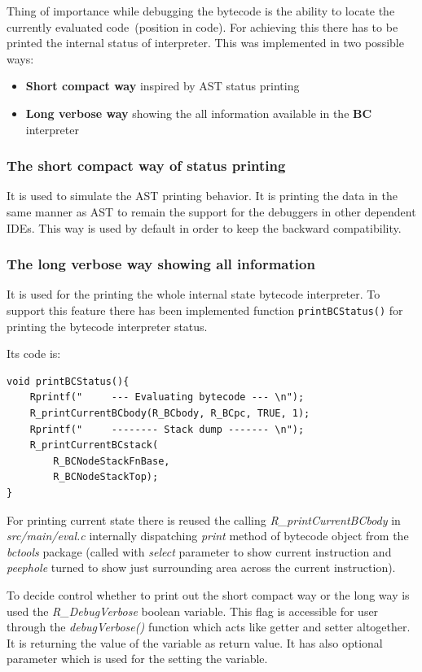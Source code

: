 \documentclass[thesis=M,english]{FITthesis}[2018/10/20]
\newcommand{\code}[1]{\texttt{#1}}
\begin{document}
Thing of importance while debugging the bytecode is the ability to locate the currently evaluated code~(position in code). For achieving this there has to be printed the internal status of interpreter. This was implemented in two possible ways:

\begin{itemize}
	\item \textbf{Short compact way} inspired by AST status printing
	\item \textbf{Long verbose way} showing the all information available in the \textbf{BC} interpreter
\end{itemize}

\subsubsection{The short compact way of status printing}\label{short-compact-way-of-status-printing}
It is used to simulate the AST printing behavior. It is printing the data in the same manner as AST to remain the support for the debuggers in other dependent IDEs. This way is used by default in order to keep the backward compatibility.

\subsubsection{The long verbose way showing all information}\label{long-verbose-way}
It is used for the printing the whole internal state bytecode interpreter. To support this feature there has been implemented function \code{printBCStatus()} for printing the bytecode interpreter status.

Its code is:
\begin{lstlisting}
void printBCStatus(){
    Rprintf("     --- Evaluating bytecode --- \n");
    R_printCurrentBCbody(R_BCbody, R_BCpc, TRUE, 1);
    Rprintf("     -------- Stack dump ------- \n");
    R_printCurrentBCstack(
    	R_BCNodeStackFnBase, 
    	R_BCNodeStackTop);
}
\end{lstlisting}

For printing current state there is reused the calling \textit{R{\_}printCurrentBCbody} in \textit{src/main/eval.c} internally dispatching \textit{print} method of bytecode object from the \textit{bctools} package (called with \textit{select} parameter to show current instruction and \textit{peephole} turned to show just surrounding area across the current instruction).

To decide control whether to print out the short compact way or the long way is used the \textit{R{\_}DebugVerbose} boolean variable. This flag is accessible for user through the \textit{debugVerbose()} function which acts like getter and setter altogether. It is returning the value of the variable as return value. It has also optional parameter which is used for the setting the variable. 
\end{document}
